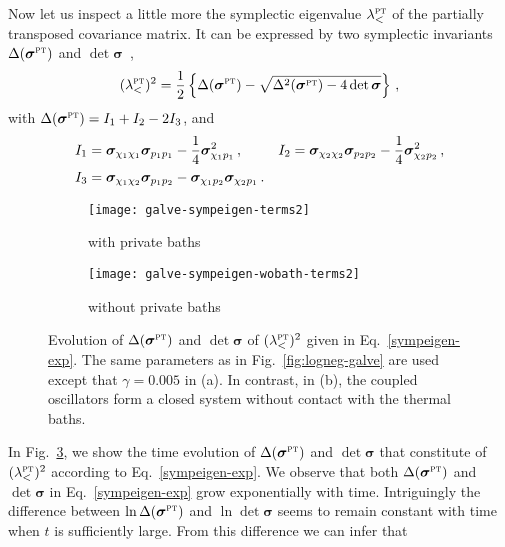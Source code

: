 \documentclass[11pt,a4paper]{article}
\begin{document}
Now let us inspect a little more the symplectic eigenvalue $\lambda_{<}^{\textsc{pt}}$ of the partially transposed covariance matrix. It can be expressed by two symplectic invariants $\Delta(\bm{\sigma}^{\textsc{pt}})$ and $\det \bm{\sigma}$~\cite{PPTSimon,Illuminati04},
\begin{align}
	(\lambda_{<}^{\textsc{pt}})^{2} = \frac{1}{2}\left\{ \Delta(\bm{\sigma}^{\textsc{pt}}) - \sqrt{\Delta^2(\bm{\sigma}^{\textsc{pt}}) - 4\det \bm{\sigma}}  \right\}\,, \label{sympeigen-exp}
\end{align}
with $\Delta(\bm{\sigma}^{\textsc{pt}}) =  I_{1}+I_{2}-2I_{3}$, and
\begin{align}
    I_1 &=\bm{\sigma}_{\chi_1\chi_1}\bm{\sigma}_{p_1p_1} -\frac{1}{4}\bm{\sigma}_{\chi_1p_1}^2\,,  &I_2 &=\bm{\sigma}_{\chi_2\chi_2}\bm{\sigma}_{p_2p_2} -\frac{1}{4}\bm{\sigma}_{\chi_2p_2}^2\,,\notag \\
    I_3 &=\bm{\sigma}_{\chi_1\chi_2}\bm{\sigma}_{p_1p_2}-\bm{\sigma}_{\chi_1p_2}\bm{\sigma}_{\chi_2p_1}\,.  \label{sympeigen-exp-det}
\end{align}
\begin{figure}
  	\begin{subfigure}{0.49\textwidth}
     	\texttt{[image: galve-sympeigen-terms2]}     
     	\caption{with private baths}
		\label{fig:galve-sympeigen-terms-wbath}
	\end{subfigure}
 	\hfill
	\begin{subfigure}{0.49\textwidth}
     	\texttt{[image: galve-sympeigen-wobath-terms2]}
     	\caption{without private baths}
		\label{fig:galve-sympeigen-terms-wobath}
	\end{subfigure}
	\caption{Evolution of $\Delta(\bm{\sigma}^{\textsc{pt}})$ and $\det\bm{\sigma}$ of $(\lambda_{<}^{\textsc{pt}})^{2}$ given in Eq.~\eqref{sympeigen-exp}. The same parameters as in  Fig.~\ref{fig:logneg-galve}  are used except that $\gamma = 0.005$ in (a). In {contrast, in} (b), the coupled oscillators form a closed system without contact with the thermal baths.}
\label{fig:galve-sympeigen-terms}
\end{figure}
In Fig.~\ref{fig:galve-sympeigen-terms}, we show the time evolution of $\Delta(\bm{\sigma}^{\textsc{pt}})$ and $\det\bm{\sigma}$ that constitute of $(\lambda_{<}^{\textsc{pt}})^{2}$ according to Eq.~\eqref{sympeigen-exp}. We observe that both $\Delta(\bm{\sigma}^{\textsc{pt}})$ and $\det \bm{\sigma} $ in Eq.~\eqref{sympeigen-exp} grow exponentially with time. Intriguingly the difference between $\ln\Delta(\bm{\sigma}^{\textsc{pt}})$ and $\ln\det \bm{\sigma}$ seems to remain constant with time when $t$ is sufficiently large. From this difference we can infer that 
\end{document}

